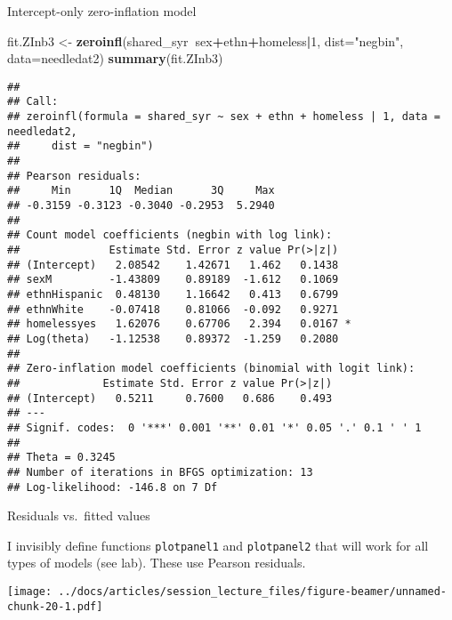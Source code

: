 \documentclass[
  ignorenonframetext,
]{beamer}
\newenvironment{Shaded}{\begin{snugshade}}{\end{snugshade}}
\newcommand{\DataTypeTok}[1]{\textcolor[rgb]{0.13,0.29,0.53}{#1}}
\newcommand{\DecValTok}[1]{\textcolor[rgb]{0.00,0.00,0.81}{#1}}
\newcommand{\KeywordTok}[1]{\textcolor[rgb]{0.13,0.29,0.53}{\textbf{#1}}}
\newcommand{\NormalTok}[1]{#1}
\newcommand{\OperatorTok}[1]{\textcolor[rgb]{0.81,0.36,0.00}{\textbf{#1}}}
\newcommand{\StringTok}[1]{\textcolor[rgb]{0.31,0.60,0.02}{#1}}
\begin{document}
\begin{frame}[fragile]{Intercept-only zero-inflation model}
\protect\hypertarget{intercept-only-zero-inflation-model}{}

\tiny

\begin{Shaded}
\begin{Highlighting}[]
\NormalTok{fit.ZInb3 <-}\StringTok{ }\KeywordTok{zeroinfl}\NormalTok{(shared_syr}\OperatorTok{~}\NormalTok{sex}\OperatorTok{+}\NormalTok{ethn}\OperatorTok{+}\NormalTok{homeless}\OperatorTok{|}\DecValTok{1}\NormalTok{, }
                        \DataTypeTok{dist=}\StringTok{"negbin"}\NormalTok{, }\DataTypeTok{data=}\NormalTok{needledat2)}
\KeywordTok{summary}\NormalTok{(fit.ZInb3)}
\end{Highlighting}
\end{Shaded}

\begin{verbatim}
## 
## Call:
## zeroinfl(formula = shared_syr ~ sex + ethn + homeless | 1, data = needledat2, 
##     dist = "negbin")
## 
## Pearson residuals:
##     Min      1Q  Median      3Q     Max 
## -0.3159 -0.3123 -0.3040 -0.2953  5.2940 
## 
## Count model coefficients (negbin with log link):
##              Estimate Std. Error z value Pr(>|z|)  
## (Intercept)   2.08542    1.42671   1.462   0.1438  
## sexM         -1.43809    0.89189  -1.612   0.1069  
## ethnHispanic  0.48130    1.16642   0.413   0.6799  
## ethnWhite    -0.07418    0.81066  -0.092   0.9271  
## homelessyes   1.62076    0.67706   2.394   0.0167 *
## Log(theta)   -1.12538    0.89372  -1.259   0.2080  
## 
## Zero-inflation model coefficients (binomial with logit link):
##             Estimate Std. Error z value Pr(>|z|)
## (Intercept)   0.5211     0.7600   0.686    0.493
## ---
## Signif. codes:  0 '***' 0.001 '**' 0.01 '*' 0.05 '.' 0.1 ' ' 1 
## 
## Theta = 0.3245 
## Number of iterations in BFGS optimization: 13 
## Log-likelihood: -146.8 on 7 Df
\end{verbatim}

\end{frame}

\begin{frame}[fragile]{Residuals vs.~fitted values}
\protect\hypertarget{residuals-vs.-fitted-values}{}

I invisibly define functions \texttt{plotpanel1} and \texttt{plotpanel2}
that will work for all types of models (see lab). These use Pearson
residuals.

\texttt{[image: ../docs/articles/session\_lecture\_files/figure-beamer/unnamed-chunk-20-1.pdf]}

\end{frame}
\end{document}
